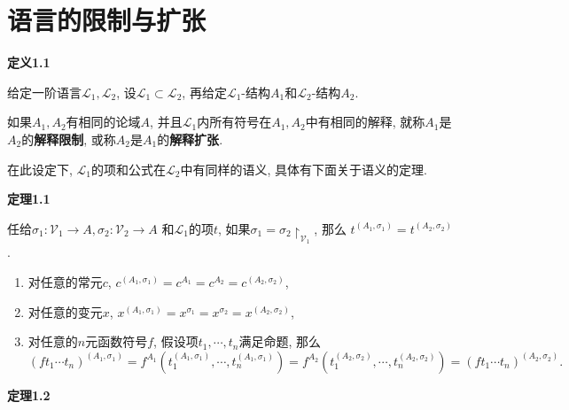 


\setlength{\abovedisplayskip}{1pt}
\setlength{\belowdisplayskip}{1pt}

\section{语言的限制与扩张}

\hypertarget{sec:定义1.1}{}
\noindent\textbf{定义1.1}

给定一阶语言$\mathcal{L}_1,\mathcal{L}_2$, 设$\mathcal{L}_1\subset\mathcal{L}_2$,
再给定$\mathcal{L}_1$-结构$A_1$和$\mathcal{L}_2$-结构$A_2$.

如果$A_1,A_2$有相同的论域$A$, 并且$\mathcal{L}_1$内所有符号在$A_1,A_2$中有相同的解释,
就称$A_1$是$A_2$的\textbf{解释限制}, 或称$A_2$是$A_1$的\textbf{解释扩张}.

\vspace{10pt}

在此设定下, $\mathcal{L}_1$的项和公式在$\mathcal{L}_2$中有同样的语义,
具体有下面关于语义的定理.

\vspace{10pt}

\hypertarget{sec:定理1.1}{}
\noindent\textbf{定理1.1}

任给$\sigma_1:\mathcal{V}_1\to A,\sigma_2:\mathcal{V}_2\to A$
和$\mathcal{L}_1$的项$t$, 如果$\sigma_1=\sigma_2\!\restriction_{\mathcal{V}_1}$, 那么
$t^{(A_1,\sigma_1)}=t^{(A_2,\sigma_2)}$.


\begin{enumerate}
    \item 对任意的常元$c$, $c^{(A_1,\sigma_1)}=c^{A_1}=c^{A_2}=c^{(A_2,\sigma_2)}$,
    \item 对任意的变元$x$,
    $x^{(A_1,\sigma_1)}=x^{\sigma_1}=x^{\sigma_2}=x^{(A_2,\sigma_2)}$,
    \item 对任意的$n$元函数符号$f$, 假设项$t_1,\cdots,t_n$满足命题, 那么
    \begin{equation*}
        (ft_1\cdots t_n)^{(A_1,\sigma_1)}
        =f^{A_1}(t_1^{(A_1,\sigma_1)},\cdots,t_n^{(A_1,\sigma_1)})
        =f^{A_2}(t_1^{(A_2,\sigma_2)},\cdots,t_n^{(A_2,\sigma_2)})
        =(ft_1\cdots t_n)^{(A_2,\sigma_2)}.
    \tag*{\qedsymbol}\end{equation*}
\end{enumerate}

\vspace{10pt}

\hypertarget{sec:定理1.2}{}
\noindent\textbf{定理1.2}

